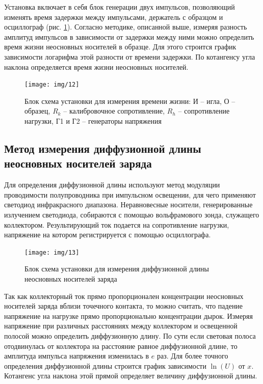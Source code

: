 Установка включает в себя блок генерации двух импульсов, позволяющий изменять время задержки между импульсами, держатель с образцом и осциллограф (рис.  \ref{fig:figure11}). Согласно методике, описанной выше, измеряя разность амплитуд импульсов в зависимости от задержки между ними можно определить время жизни неосновных носителей в образце. Для этого строится график зависимости логарифма этой разности от времени задержки. По котангенсу угла наклона определяется время жизни неосновных носителей.
\begin{figure}[H]
	\centering
	\texttt{[image: img/12]}
	\caption{Блок схема установки для измерения времени жизни:
И -- игла, О -- образец, $R_k$ -- калибровочное сопротивление, $R_h$ -- сопротивление нагрузки, Г1 и Г2 -- генераторы напряжения }
	\label{fig:figure11}
\end{figure}


\subsection{Метод измерения диффузионной длины неосновных носителей заряда}

Для определения диффузионной длины используют метод модуляции проводимости полупроводника при импульсном освещении, для чего применяют светодиод инфракрасного диапазона. Неравновесные носители, генерированные излучением светодиода, собираются с помощью вольфрамового зонда, служащего коллектором. Результирующий ток подается на сопротивление нагрузки, напряжение на котором регистрируется с помощью осциллографа.

\begin{figure}[H]
	\centering
	\texttt{[image: img/13]}
	\caption{Блок схема установки для измерения диффузионной длины неосновных носителей заряда}
	\label{fig:figure12}
\end{figure}


Так как коллекторный ток прямо пропорционален концентрации неосновных носителей заряда вблизи точечного контакта, то можно считать, что падение напряжение на нагрузке прямо пропорционально концентрации дырок. Измеряя напряжение при различных расстояниях между коллектором и освещенной полосой можно определить диффузионную длину. По сути если световая полоса отодвинулась от коллектора на расстояние равное диффузионной длине, то амплитуда импульса напряжения изменилась в $e$ раз. Для более точного определения диффузионной длины строится график зависимости $\ln(U)$ от $x$. Котангенс угла наклона этой прямой определяет величину диффузионной длины.

